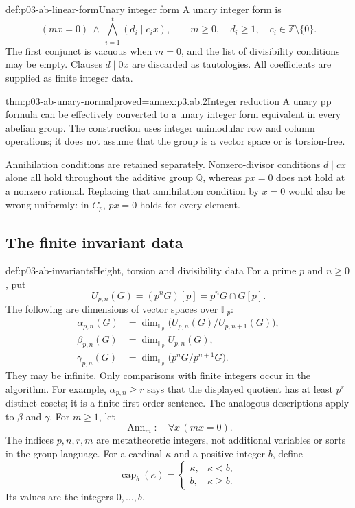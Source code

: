\begin{hbdefinition}{def:p03-ab-linear-form}{Unary integer form}
A unary integer form is
\[
 (mx=0)\ \land\ \bigwedge_{i=1}^{t}(d_i\mid c_i x),
 \qquad
 m\geq0,\quad d_i\geq1,\quad c_i\in\mathbb Z\setminus\{0\}.
\]
The first conjunct is vacuous when \(m=0\), and the list of divisibility
conditions may be empty. Clauses \(d\mid0x\) are discarded as tautologies.
All coefficients are supplied as finite integer data.
\end{hbdefinition}

\begin{hblemma}{thm:p03-ab-unary-normal}{proved=annex:p3.ab.2}{Integer reduction}
A unary pp formula can be effectively converted to a unary integer form
equivalent in every abelian group. The construction uses integer
unimodular row and column operations; it does not assume that the group
is a vector space or is torsion-free.
\end{hblemma}

Annihilation conditions are retained separately. Nonzero-divisor
conditions \(d\mid cx\) alone all hold throughout the additive group
\(\mathbb Q\), whereas \(px=0\) does not hold at a nonzero rational.
Replacing that annihilation condition by \(x=0\) would also be wrong
uniformly: in \(C_p\), \(px=0\) holds for every element.

\subsection{The finite invariant data}

\begin{hbdefinition}{def:p03-ab-invariants}{Height, torsion and divisibility data}
For a prime \(p\) and \(n\geq0\), put
\[
 U_{p,n}(G)=(p^nG)[p]=p^nG\cap G[p].
\]
The following are dimensions of vector spaces over \(\mathbb F_p\):
\[
 \begin{aligned}
 \alpha_{p,n}(G)&=\dim_{\mathbb F_p}
                   \bigl(U_{p,n}(G)/U_{p,n+1}(G)\bigr),\\
 \beta_{p,n}(G)&=\dim_{\mathbb F_p}U_{p,n}(G),\\
 \gamma_{p,n}(G)&=\dim_{\mathbb F_p}
                   \bigl(p^nG/p^{n+1}G\bigr).
 \end{aligned}
\]
They may be infinite. Only comparisons with finite integers occur in the
algorithm. For example, \(\alpha_{p,n}\geq r\) says that the displayed
quotient has at least \(p^r\) distinct cosets; it is a finite first-order
sentence. The analogous descriptions apply to \(\beta\) and \(\gamma\).
For \(m\geq1\), let
\[
 \operatorname{Ann}_m:\quad \forall x\,(mx=0).
\]
The indices \(p,n,r,m\) are metatheoretic integers, not additional
variables or sorts in the group language. For a cardinal \(\kappa\)
and a positive integer \(b\), define
\[
 \operatorname{cap}_b(\kappa)=
 \begin{cases}\kappa,&\kappa<b,\\b,&\kappa\geq b.\end{cases}
\]
Its values are the integers \(0,\ldots,b\).
\end{hbdefinition}

